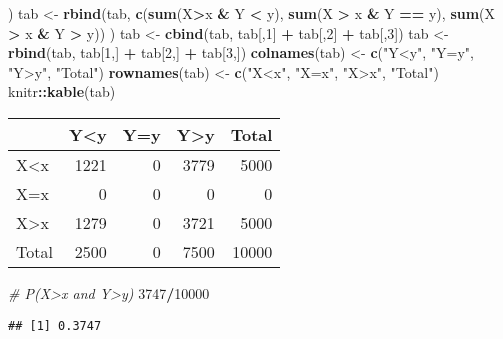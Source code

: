 \documentclass[]{article}
\newenvironment{Shaded}{\begin{snugshade}}{\end{snugshade}}
\newcommand{\KeywordTok}[1]{\textcolor[rgb]{0.13,0.29,0.53}{\textbf{#1}}}
\newcommand{\DecValTok}[1]{\textcolor[rgb]{0.00,0.00,0.81}{#1}}
\newcommand{\StringTok}[1]{\textcolor[rgb]{0.31,0.60,0.02}{#1}}
\newcommand{\CommentTok}[1]{\textcolor[rgb]{0.56,0.35,0.01}{\textit{#1}}}
\newcommand{\OperatorTok}[1]{\textcolor[rgb]{0.81,0.36,0.00}{\textbf{#1}}}
\newcommand{\NormalTok}[1]{#1}
\begin{document}
\begin{Shaded}
\begin{Highlighting}[]
\NormalTok{             )}
\NormalTok{tab <-}\StringTok{ }\KeywordTok{rbind}\NormalTok{(tab,}
              \KeywordTok{c}\NormalTok{(}\KeywordTok{sum}\NormalTok{(X}\OperatorTok{>}\NormalTok{x }\OperatorTok{&}\StringTok{ }\NormalTok{Y }\OperatorTok{<}\StringTok{ }\NormalTok{y),}
       \KeywordTok{sum}\NormalTok{(X }\OperatorTok{>}\StringTok{ }\NormalTok{x }\OperatorTok{&}\StringTok{ }\NormalTok{Y }\OperatorTok{==}\StringTok{ }\NormalTok{y),}
       \KeywordTok{sum}\NormalTok{(X }\OperatorTok{>}\StringTok{ }\NormalTok{x }\OperatorTok{&}\StringTok{ }\NormalTok{Y }\OperatorTok{>}\StringTok{ }\NormalTok{y))}
\NormalTok{             )}
\NormalTok{tab <-}\StringTok{ }\KeywordTok{cbind}\NormalTok{(tab, tab[,}\DecValTok{1}\NormalTok{] }\OperatorTok{+}\StringTok{ }\NormalTok{tab[,}\DecValTok{2}\NormalTok{] }\OperatorTok{+}\StringTok{ }\NormalTok{tab[,}\DecValTok{3}\NormalTok{])}
\NormalTok{tab <-}\StringTok{ }\KeywordTok{rbind}\NormalTok{(tab, tab[}\DecValTok{1}\NormalTok{,] }\OperatorTok{+}\StringTok{ }\NormalTok{tab[}\DecValTok{2}\NormalTok{,] }\OperatorTok{+}\StringTok{ }\NormalTok{tab[}\DecValTok{3}\NormalTok{,])}
\KeywordTok{colnames}\NormalTok{(tab) <-}\StringTok{ }\KeywordTok{c}\NormalTok{(}\StringTok{"Y<y"}\NormalTok{, }\StringTok{"Y=y"}\NormalTok{, }\StringTok{"Y>y"}\NormalTok{, }\StringTok{"Total"}\NormalTok{)}
\KeywordTok{rownames}\NormalTok{(tab) <-}\StringTok{ }\KeywordTok{c}\NormalTok{(}\StringTok{"X<x"}\NormalTok{, }\StringTok{"X=x"}\NormalTok{, }\StringTok{"X>x"}\NormalTok{, }\StringTok{"Total"}\NormalTok{)}
\NormalTok{knitr}\OperatorTok{::}\KeywordTok{kable}\NormalTok{(tab)}
\end{Highlighting}
\end{Shaded}

\begin{longtable}[]{@{}lrrrr@{}}
\toprule
& Y\textless{}y & Y=y & Y\textgreater{}y & Total\tabularnewline
\midrule
\endhead
X\textless{}x & 1221 & 0 & 3779 & 5000\tabularnewline
X=x & 0 & 0 & 0 & 0\tabularnewline
X\textgreater{}x & 1279 & 0 & 3721 & 5000\tabularnewline
Total & 2500 & 0 & 7500 & 10000\tabularnewline
\bottomrule
\end{longtable}

\begin{Shaded}
\begin{Highlighting}[]
\CommentTok{# P(X>x and Y>y)}
\DecValTok{3747}\OperatorTok{/}\DecValTok{10000}
\end{Highlighting}
\end{Shaded}

\begin{verbatim}
## [1] 0.3747
\end{verbatim}
\end{document}
